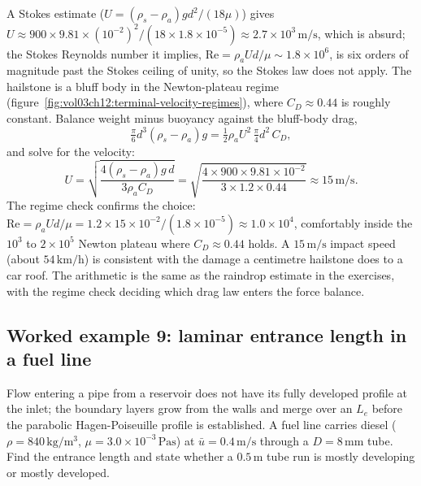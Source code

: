 A Stokes estimate ($U = (\rho_s-\rho_a)g d^2/(18\mu)$) gives
$U \approx 900\times9.81\times(10^{-2})^2/(18\times1.8\times10^{-5})
\approx 2.7\times10^{3}\,\si{\meter\per\second}$, which is absurd; the
Stokes Reynolds number it implies, $\text{Re} = \rho_a U d/\mu \sim
1.8\times10^6$, is six orders of magnitude past the Stokes ceiling
of unity, so the Stokes law does not apply. The hailstone is a bluff
body in the Newton-plateau regime
(figure~\ref{fig:vol03ch12:terminal-velocity-regimes}), where
$C_D\approx0.44$ is roughly constant. Balance weight minus buoyancy
against the bluff-body drag,
\[
\tfrac{\pi}{6}d^3(\rho_s-\rho_a)g = \tfrac12\rho_a U^2\,
\tfrac{\pi}{4}d^2\,C_D,
\]
and solve for the velocity:
\[
U = \sqrt{\frac{4(\rho_s-\rho_a)g\,d}{3\rho_a C_D}} = \sqrt{\frac{
4\times900\times9.81\times10^{-2}}{3\times1.2\times0.44}} \approx
15\,\si{\meter\per\second}.
\]
The regime check confirms the choice: $\text{Re} = \rho_a U d/\mu =
1.2\times15\times10^{-2}/(1.8\times10^{-5}) \approx 1.0\times10^4$,
comfortably inside the $10^3$ to $2\times10^5$ Newton plateau where
$C_D\approx0.44$ holds. A $15\,\si{\meter\per\second}$ impact speed
(about $54\,\text{km/h}$) is consistent with the damage a centimetre
hailstone does to a car roof. The arithmetic is the same as the
raindrop estimate in the exercises, with the regime check deciding
which drag law enters the force balance.

\subsection*{Worked example 9: laminar entrance length in a fuel line}

Flow entering a pipe from a reservoir does not have its fully
developed profile at the inlet; the boundary layers grow from the
walls and merge over an  $L_e$ before the
parabolic Hagen-Poiseuille profile is established. A fuel line
carries diesel ($\rho = 840\,\si{\kilogram\per\meter\cubed}$, $\mu =
3.0\times10^{-3}\,\si{\pascal\second}$) at $\bar u = 0.4\,\si{\meter
\per\second}$ through a $D = 8\,\si{\milli\meter}$ tube. Find the
entrance length and state whether a $0.5\,\si{\meter}$ tube run is
mostly developing or mostly developed.

